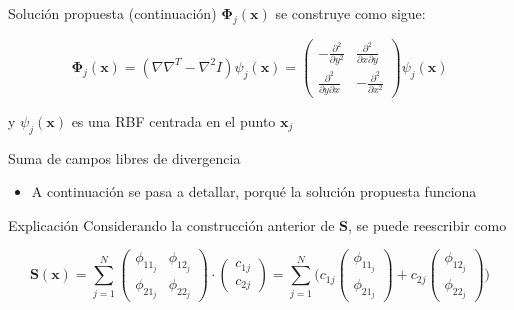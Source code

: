 \documentclass{beamer}
\begin{document}
\begin{frame}
  \begin{block}{Solución propuesta (continuación)}
    $\mathbf{\Phi}_j(\mathbf{x})$ se construye como sigue:

    $$ \mathbf{\Phi}_j(\mathbf{x}) =
    (\nabla \nabla^T - \nabla^2 I)\psi_j(\mathbf{x})=
    \begin{pmatrix}
    -\frac{\partial^2}{\partial y^2} & \frac{\partial^2}{\partial x \partial y} \\
    \frac{\partial^2}{\partial y \partial x} & -\frac{\partial^2}{\partial x^2}
    \end{pmatrix}\psi_j(\mathbf{x}) $$
  \end{block}

  y $\psi_j(\mathbf{x})$ es una RBF centrada en el punto $\mathbf{x}_j
  $
\end{frame}


\begin{frame}{Suma de campos libres de divergencia}
\begin{itemize}
  \item A continuación se pasa a detallar, porqué la solución propuesta funciona
\end{itemize}

\begin{block}{Explicación}
  Considerando la construcción anterior de $\mathbf{S}$, se puede reescribir como

  $$
  \mathbf{S}(\mathbf{x})=\sum_{j=1}^N
  \begin{pmatrix}
  \phi_{11_{j}} & \phi_{12_{j}} \\
  \phi_{21_{j}} & \phi_{22_{j}}
  \end{pmatrix} \cdot
  \begin{pmatrix} c_{1j} \\ c_{2j} \end{pmatrix} =
  \sum_{j=1}^N \Big(
  c_{1j} \begin{pmatrix} \phi_{11_{j}} \\ \phi_{21_{j}} \end{pmatrix} +
  c_{2j} \begin{pmatrix} \phi_{12_{j}} \\ \phi_{22_{j}} \end{pmatrix} \Big)
  $$  
\end{block}
 
\end{frame}
\end{document}
